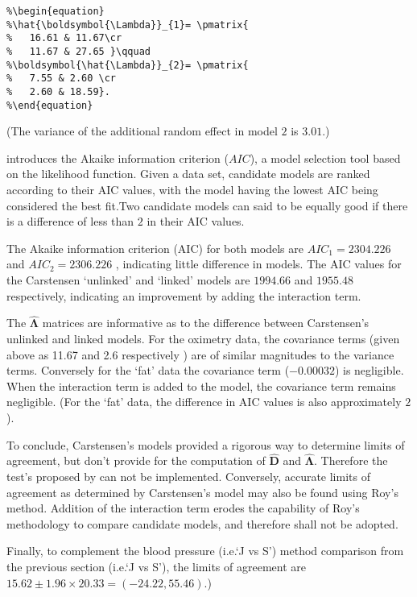\documentclass[12pt, a4paper]{report}
\theoremstyle{plain}
\theoremstyle{definition}
\theoremstyle{remark}
\begin{document}
\begin{verbatim}
%\begin{equation}
%\hat{\boldsymbol{\Lambda}}_{1}= \pmatrix{
%	16.61 &	11.67\cr
%	11.67 & 27.65 }\qquad
%\boldsymbol{\hat{\Lambda}}_{2}= \pmatrix{
%	7.55 & 2.60 \cr
%	2.60 & 18.59}.
%\end{equation}
\end{verbatim}
\noindent (The variance of the additional random effect in model $2$ is $3.01$.)

\citet{akaike} introduces the Akaike information criterion ($AIC$), a model
selection tool based on the likelihood function. Given a data set, candidate models
are ranked according to their AIC values, with the model having the lowest AIC being considered the best fit.Two candidate models can said to be equally good if there is a difference of less than $2$ in their AIC values.

The Akaike information criterion (AIC) for both models are $AIC_{1} = 2304.226$ and $AIC_{2} = 2306.226$ , indicating little difference in models. The AIC values for the Carstensen `unlinked' and `linked' models are $1994.66$ and $1955.48$ respectively, indicating an improvement by adding the interaction term.

The $\boldsymbol{\hat{\Lambda}}$ matrices are informative as to the difference between Carstensen's unlinked and linked models. For the oximetry data, the covariance terms (given above as 11.67 and 2.6 respectively ) are of similar magnitudes to the variance terms. Conversely for the `fat' data the covariance term ($-0.00032$) is negligible. When the interaction term is added to the model, the covariance term remains negligible. (For the `fat' data, the difference in AIC values is also approximately $2$).

To conclude, Carstensen's models provided a rigorous way to determine limits of agreement, but don't provide for the computation of $\boldsymbol{\hat{D}}$ and $\boldsymbol{\hat{\Lambda}}$. Therefore the test's proposed by \citet{roy} can not be implemented. Conversely, accurate limits of agreement as determined by Carstensen's model may also be found using Roy's method. Addition of the interaction term erodes the capability of Roy's methodology to compare candidate models, and therefore shall not be adopted.

Finally, to complement the blood pressure (i.e.`J vs S') method comparison from the previous section (i.e.`J vs S'), the limits of agreement are $15.62 \pm 1.96 \times 20.33 = (-24.22, 55.46)$.)
\newpage
\end{document}
